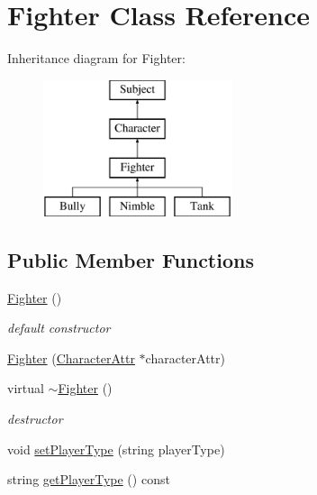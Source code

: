 \hypertarget{class_fighter}{}\section{Fighter Class Reference}
\label{class_fighter}
Inheritance diagram for Fighter\+:\begin{figure}[H]
\begin{center}
\leavevmode
\includegraphics[height=4.000000cm]{class_fighter}
\end{center}
\end{figure}
\subsection*{Public Member Functions}
\begin{DoxyCompactItemize}
\item 
\hypertarget{class_fighter_ae1d4ac29ed8dac91af41e6396ee00dda}{}\label{class_fighter_ae1d4ac29ed8dac91af41e6396ee00dda} 
\hyperlink{class_fighter_ae1d4ac29ed8dac91af41e6396ee00dda}{Fighter} ()
\begin{DoxyCompactList}\small\item\em default constructor \end{DoxyCompactList}\item 
\hyperlink{class_fighter_a0cae9242bed3683042205be70c67b02f}{Fighter} (\hyperlink{class_character_attr}{Character\+Attr} $\ast$character\+Attr)
\item 
\hypertarget{class_fighter_a7c7f2ffa4724887e564af51a6154b703}{}\label{class_fighter_a7c7f2ffa4724887e564af51a6154b703} 
virtual \hyperlink{class_fighter_a7c7f2ffa4724887e564af51a6154b703}{$\sim$\+Fighter} ()
\begin{DoxyCompactList}\small\item\em destructor \end{DoxyCompactList}\item 
void \hyperlink{class_fighter_a1435f9894dc4ffa11bfe13730b530ab6}{set\+Player\+Type} (string player\+Type)
\item 
string \hyperlink{class_fighter_a928346e8e831a642622e89233100dc0e}{get\+Player\+Type} () const
\end{DoxyCompactItemize}
